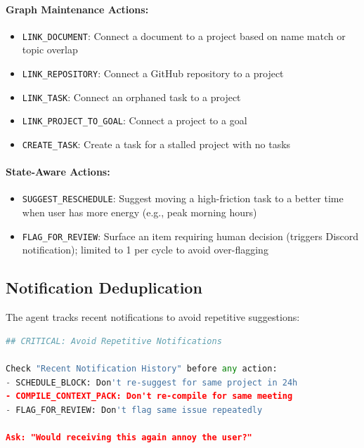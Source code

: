 \documentclass[11pt,a4paper]{article}
\begin{document}
\paragraph{Graph Maintenance Actions:}
\begin{itemize}
    \item \texttt{LINK\_DOCUMENT}: Connect a document to a project based on name match or topic overlap
    \item \texttt{LINK\_REPOSITORY}: Connect a GitHub repository to a project
    \item \texttt{LINK\_TASK}: Connect an orphaned task to a project
    \item \texttt{LINK\_PROJECT\_TO\_GOAL}: Connect a project to a goal
    \item \texttt{CREATE\_TASK}: Create a task for a stalled project with no tasks
\end{itemize}

\paragraph{State-Aware Actions:}
\begin{itemize}
    \item \texttt{SUGGEST\_RESCHEDULE}: Suggest moving a high-friction task to a better time when user has more energy (e.g., peak morning hours)
    \item \texttt{FLAG\_FOR\_REVIEW}: Surface an item requiring human decision (triggers Discord notification); limited to 1 per cycle to avoid over-flagging
\end{itemize}

\subsection{Notification Deduplication}

The agent tracks recent notifications to avoid repetitive suggestions:

\begin{lstlisting}[language=Python]
## CRITICAL: Avoid Repetitive Notifications

Check "Recent Notification History" before any action:
- SCHEDULE_BLOCK: Don't re-suggest for same project in 24h
- COMPILE_CONTEXT_PACK: Don't re-compile for same meeting
- FLAG_FOR_REVIEW: Don't flag same issue repeatedly

Ask: "Would receiving this again annoy the user?"
\end{lstlisting}
\end{document}
